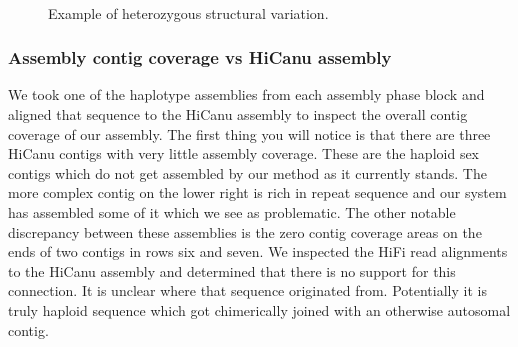 {\begin{figure}[htbp!]
\caption{Example of heterozygous structural variation.}
\label{figure:assemblyplot}
\begin{centering}
 \\
\end{centering}
\end{figure}

\subsubsection{Assembly contig coverage vs HiCanu assembly}

\par{
We took one of the haplotype assemblies from each assembly phase block and aligned that sequence to the HiCanu assembly to inspect the overall contig coverage of our assembly. The first thing you will notice is that there are three HiCanu contigs with very little assembly coverage. These are the haploid sex contigs which do not get assembled by our method as it currently stands. The more complex contig on the lower right is rich in repeat sequence and our system has assembled some of it which we see as problematic. The other notable discrepancy between these assemblies is the zero contig coverage areas on the ends of two contigs in rows six and seven. We inspected the HiFi read alignments to the HiCanu assembly and determined that there is no support for this connection. It is unclear where that sequence originated from. Potentially it is truly haploid sequence which got chimerically joined with an otherwise autosomal contig.
}

}
